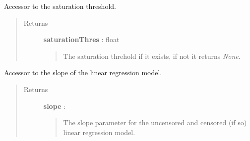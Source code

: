 \documentclass[letterpaper,10pt,english]{sphinxmanual}
\begin{document}
\begin{fulllineitems}
\begin{fulllineitems}
\end{fulllineitems}


\begin{fulllineitems}
\label{_generated/otpod.UnivariateLinearModelAnalysis:otpod.UnivariateLinearModelAnalysis.getSaturationThreshold}
Accessor to the saturation threshold.
\begin{quote}\begin{description}
\item[{Returns}] \leavevmode
\textbf{saturationThres} : float
\begin{quote}

The saturation threhold if it exists, if not it returns \emph{None}.
\end{quote}

\end{description}\end{quote}

\end{fulllineitems}


\begin{fulllineitems}
\label{_generated/otpod.UnivariateLinearModelAnalysis:otpod.UnivariateLinearModelAnalysis.getSlope}
Accessor to the slope of the linear regression model.
\begin{quote}\begin{description}
\item[{Returns}] \leavevmode
\textbf{slope} : \href{http://doc.openturns.org/openturns-latest/sphinx/user\_manual/\_generated/openturns.NumericalPoint.html\#openturns.NumericalPoint}{}
\begin{quote}

The slope parameter for the uncensored and censored (if so) linear
regression model.
\end{quote}

\end{description}\end{quote}

\end{fulllineitems}



\end{fulllineitems}
\end{document}
